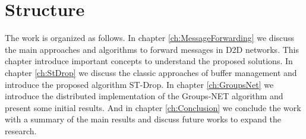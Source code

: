 \section{Structure}
\label{sec:intro.structure}
The work is organized as follows. In chapter \ref{ch:MessageForwarding} we discuss the main approaches and algorithms to forward messages in D2D networks. This chapter introduce important concepts to understand the proposed solutions. In chapter \ref{ch:StDrop} we discuss the classic approaches of buffer management and introduce the proposed algorithm ST-Drop. In chapter \ref{ch:GroupsNet} we introduce the distributed implementation of the Groups-NET algorithm and present some initial results. And in chapter \ref{ch:Conclusion} we conclude the work with a summary of the main results and discuss future works to expand the research.
